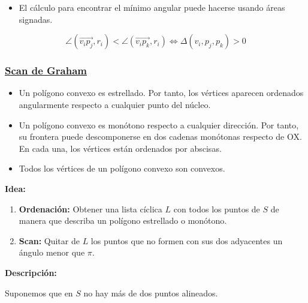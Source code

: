 \documentclass[twoside]{report}
\begin{document}
\begin{observaciones}
\begin{itemize}
\item El cálculo para encontrar el mínimo angular puede hacerse
usando áreas signadas.
\end{itemize}
$$\angle (\overrightarrow{v_ip_j},r_i) <
\angle (\overrightarrow{v_ip_k},r_i) \Leftrightarrow
\Delta(v_i,p_j,p_k)>0$$
\end{observaciones}

\subsubsection{\underline{Scan de Graham}}

\begin{itemize}
  \item Un polígono convexo es estrellado. Por tanto, los vértices
aparecen ordenados angularmente respecto a cualquier punto del
núcleo.
  \item Un polígono convexo es monótono respecto a cual\-quier
dirección. Por tanto, su frontera puede des\-com\-po\-ner\-se en
dos cadenas monótonas respecto de OX. En cada una, los vértices
están ordenados por abscisas.
  \item Todos los vértices de un polígono convexo son convexos.
\end{itemize}

\vspace{0.6cm}

{\bf Idea:}

\begin{enumerate}
  \item \textbf{Ordenación:} Obtener una lista cíclica $L$ con todos los puntos de
$S$ de manera que describa un polígono estrellado o monótono.
  \item \textbf{Scan:} Quitar de $L$ los puntos que no formen con sus dos
adyacentes un ángulo menor que $\pi$.
\end{enumerate}


{\bf Descripción:}

Suponemos que en $S$ no hay más de dos puntos alineados.
\end{document}
